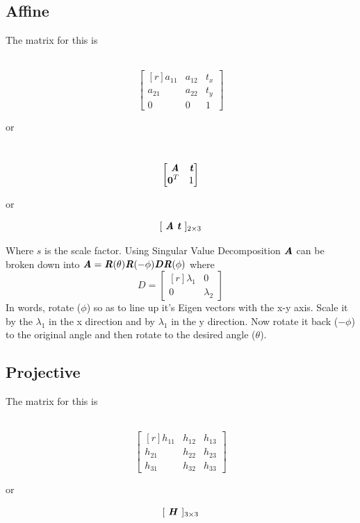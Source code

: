 \subsection{Affine}
The matrix for this is 
\begin{minipage}{0.3\textwidth}
         \ \ \
                $$  \begin{bmatrix*}[r]
               a_{11}     & a_{12}  & t_x \\
                a_{21}       & a_{22}  & t_y  \\
                0        & 0   & 1  
            \end{bmatrix*} $$   
\end{minipage}
or
\begin{minipage}{0.2\textwidth}
\ \ \
                $$  \begin{bmatrix*}[r]
                \textbf{\textit{A}}& \textbf{\textit{t}} \\
                \textbf{0}^T       & 1 
            \end{bmatrix*} $$
\end{minipage}
or
\begin{minipage}{0.2\textwidth}
    $$[ \ \textbf{\textit{A}} \ \textbf{\textit{t}} \ ]_{2\times3}$$
\end{minipage}
Where $s$ is the scale factor.
Using Singular Value Decomposition $\textbf{\textit{A}}$ can be broken down into $\textbf{\textit{A}} = \textbf{\textit{R}}(\theta)\textbf{\textit{R}}(-\phi)\textbf{\textit{D}}\textbf{\textit{R}}(\phi)$ where $$D= \begin{bmatrix*}[r]
               \lambda_1    & 0  \\
                0       & \lambda_2 
            \end{bmatrix*} $$
In words, rotate ($\phi$) so as to line up it's Eigen vectors with the x-y axis. Scale it by the $\lambda_1$ in the x direction and by $\lambda_1$ in the y direction. Now rotate it back ($-\phi$) to the original angle and then rotate to the desired angle ($\theta$).   


\subsection{Projective}
The matrix for this is 
\begin{minipage}{0.3\textwidth}
         \ \ \
                $$  \begin{bmatrix*}[r]
               h_{11}     & h_{12}  & h_{13} \\
               h_{21}     & h_{22}  & h_{23}  \\
               h_{31}     & h_{32}  & h_{33}      
            \end{bmatrix*} $$   
\end{minipage}
or
\begin{minipage}{0.2\textwidth}
    $$[ \ \textbf{\textit{H}}  \ ]_{3\times3}$$
\end{minipage}

